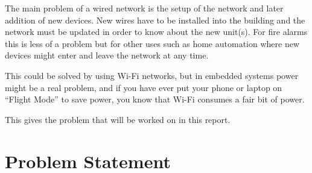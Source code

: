 The main problem of a wired network is the setup of the network and later addition of new devices. 
New wires have to be installed into the building and the network must be updated in order to know about the new unit(s).
For fire alarms this is less of a problem but for other uses such as home automation where new devices might enter and leave the network at any time.

This could be solved by using Wi-Fi networks, but in embedded systems power might be a real problem, and if you have ever put your phone or laptop on \enquote{Flight Mode} to save power, you know that Wi-Fi consumes a fair bit of power.



This gives the problem that will be worked on in this report.






\section{Problem Statement}\label{sec:problemStatement}


